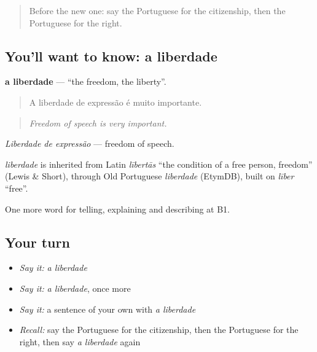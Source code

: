 \label{lesson:PT-C363-liberdade}



\begin{quote}
Before the new one: say the Portuguese for the citizenship, then the Portuguese for the right.
\end{quote}

\subsection*{You'll want to know: a liberdade}
\textbf{a liberdade} — \textquotedblleft{}the freedom, the liberty\textquotedblright{}.

\begin{quote}
A liberdade de expressão é muito importante.
\end{quote}

\begin{quote}
\emph{Freedom of speech is very important.}
\end{quote}

\emph{Liberdade de expressão} — freedom of speech.

\begin{cousinweb}
\emph{liberdade} is inherited from Latin \emph{lībertās} \textquotedblleft{}the condition of a free person, freedom\textquotedblright{} (Lewis \& Short), through Old Portuguese \emph{liberdade} (EtymDB), built on \emph{līber} \textquotedblleft{}free\textquotedblright{}.
\end{cousinweb}

\begin{grammarlens}[title={What you've built}]
One more word for telling, explaining and describing at B1.
\end{grammarlens}

\subsection*{Your turn}
\begin{itemize}
\raggedright
  \item \emph{Say it:} \emph{a liberdade}
  \item \emph{Say it:} \emph{a liberdade}, once more
  \item \emph{Say it:} a sentence of your own with \emph{a liberdade}
  \item \emph{Recall:} say the Portuguese for the citizenship, then the Portuguese for the right, then say \emph{a liberdade} again
\end{itemize}

